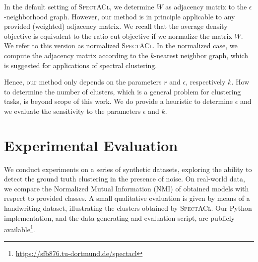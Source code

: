 In the default setting of \textsc{SpectACl}, we determine $W$ as adjacency matrix to the $\epsilon$-neighborhood graph. However, our method is in principle applicable to any provided (weighted) adjacency matrix. We recall that the average density objective is equivalent to the ratio cut objective if we normalize the matrix $W$. We refer to this version as normalized \textsc{SpectACl}. In the normalized case, we compute the adjacency matrix according to the $k$-nearest neighbor graph, which is suggested for applications of spectral clustering.

Hence, our method only depends on the parameters $r$ and $\epsilon$, respectively $k$. How to determine the number of clusters, which is a general problem for clustering tasks, is beyond scope of this work. We do provide a heuristic to determine $\epsilon$ and we evaluate the sensitivity to the parameters $\epsilon$ and $k$. 
\section{Experimental Evaluation}
We conduct experiments on a series of synthetic datasets, exploring the ability to detect the ground truth clustering in the presence of noise. On real-world data, we compare the Normalized Mutual Information (NMI) of obtained models with respect to provided classes. A small qualitative evaluation is given by means of a handwriting dataset, illustrating the clusters obtained by \textsc{SpectACl}. Our Python implementation, and the data generating and evaluation script, are publicly available\footnote{\url{https://sfb876.tu-dortmund.de/spectacl}}.
